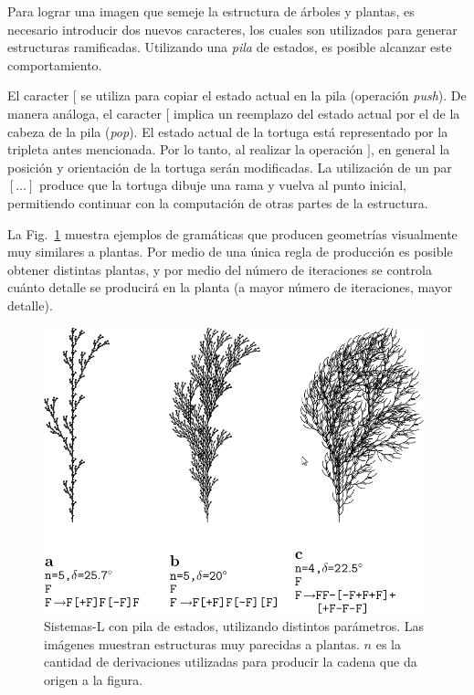 Para lograr una imagen que semeje la estructura de árboles y plantas, es necesario introducir dos nuevos caracteres, los cuales son utilizados para generar estructuras ramificadas.
Utilizando una {\em pila} de estados, es posible alcanzar este comportamiento.

El caracter $[$ se utiliza para copiar el estado actual en la pila (operación {\em push}).
De manera análoga, el caracter $[$ implica un reemplazo del estado actual por el de la cabeza de la pila ({\em pop}).
El estado actual de la tortuga está representado por la tripleta antes mencionada.
Por lo tanto, al realizar la operación $]$, en general la posición y orientación de la tortuga serán modificadas.
La utilización de un par $[\dots]$ produce que la tortuga dibuje una rama y vuelva al punto inicial, permitiendo continuar con la computación de otras partes de la estructura.

La Fig.~\ref{fg:sistemasLcorchete} muestra ejemplos de gramáticas que producen geometrías visualmente muy similares a plantas.
Por medio de una única regla de producción es posible obtener distintas plantas, y por medio del número de iteraciones se controla cuánto detalle se producirá en la planta (a mayor número de iteraciones, mayor detalle).

\begin{figure}
\center
\includegraphics[width=11cm]{figures/sistemalcorchete}
\caption[Sistemas-L con pila de estados, utilizando distintos parámetros]{Sistemas-L con pila de estados, utilizando distintos parámetros. Las imágenes muestran estructuras muy parecidas a plantas. $n$ es la cantidad de derivaciones utilizadas para producir la cadena que da origen a la figura.}
\label{fg:sistemasLcorchete}
\end{figure}


